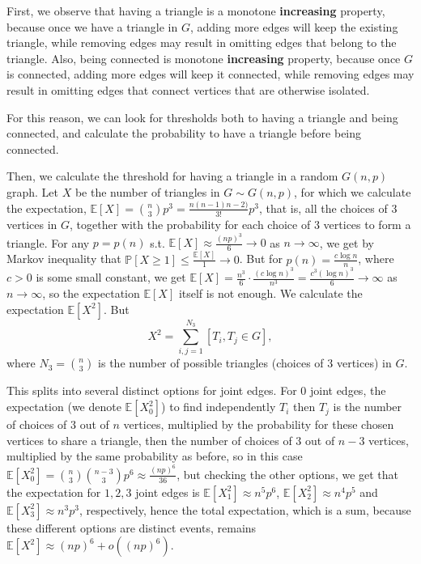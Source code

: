 \documentclass{article}
\begin{document}
First, we observe that having a triangle is a monotone \textbf{increasing} property, because once we have a triangle in $G$, adding more edges will keep the existing triangle, while removing edges may result in omitting edges that belong to the triangle. Also, being connected is monotone \textbf{increasing} property, because once $G$ is connected, adding more edges will keep it connected, while removing edges may result in omitting edges that connect vertices that are otherwise isolated.

For this reason, we can look for thresholds both to having a triangle and being connected, and calculate the probability to have a triangle before being connected.

Then, we calculate the threshold for having a triangle in a random $G(n,p)$ graph. Let $X$ be the number of triangles in $G\sim{G(n,p)}$, for which we calculate the expectation, $\mathbb{E}[X]=\binom{n}{3}p^3=\frac{n(n-1)n-2)}{3!}p^3$, that is, all the choices of $3$ vertices in $G$, together with the probability for each choice of $3$ vertices to form a triangle. For any $p=p(n)$ s.t. $\mathbb{E}[X]\approx\frac{(np)^3}{6}\rightarrow{0}$ as $n\rightarrow\infty$, we get by Markov inequality that $\mathbb{P}[X\geq{1}]\leq\frac{\mathbb{E}[X]}{1}\rightarrow{0}$. But for $p(n)=\frac{c\log{n}}{n}$, where $c>0$ is some small constant, we get $\mathbb{E}[X]=\frac{n^3}{6}\cdot\frac{(c\log{n})^3}{n^3}=\frac{c^3(\log{n})^3}{6}\rightarrow\infty$ as $n\rightarrow\infty$, so the expectation $\mathbb{E}[X]$ itself is not enough. We calculate the expectation $\mathbb{E}[X^2]$. But 
\[X^2=\sum_{i,j=1}^{N_3}[T_i,T_j\in{G}],\]
where $N_3=\binom{n}{3}$ is the number of possible triangles (choices of $3$ vertices) in $G$.

This splits into several distinct options for joint edges. For $0$ joint edges, the expectation (we denote $\mathbb{E}[X_0^2]$) to find independently $T_i$ then $T_j$ is the number of choices of $3$ out of $n$ vertices, multiplied by the probability for these chosen vertices to share a triangle, then the number of choices of $3$ out of $n-3$ vertices, multiplied by the same probability as before, so in this case $\mathbb{E}[X_0^2]=\binom{n}{3}\binom{n-3}{3}p^6\approx\frac{(np)^6}{36}$, but checking the other options, we get that the expectation for $1,2,3$ joint edges is $\mathbb{E}[X_1^2]\approx{n^5p^6}$, $\mathbb{E}[X_2^2]\approx{n^4p^5}$ and $\mathbb{E}[X_3^2]\approx{n^3p^3}$, respectively, hence the total expectation, which is a sum, because these different options are distinct events, remains $\mathbb{E}[X^2]\approx(np)^6+o((np)^6)$.
\end{document}
